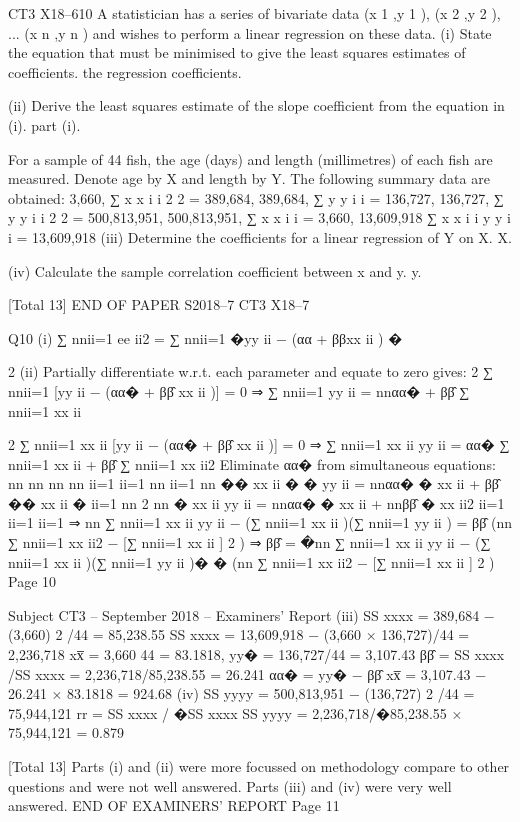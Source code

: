 CT3 X18–610
A statistician has a series of bivariate data {(x 1 ,y 1 ), (x 2 ,y 2 ), ... (x n ,y n )} and wishes to
perform a linear regression on these data.
(i) State the equation that must be minimised to give the least squares estimates of
coefficients.
the regression coefficients.

(ii) Derive the least squares estimate of the slope coefficient from the equation in
(i).
part (i).

For a sample of 44 fish, the age (days) and length (millimetres) of each fish are
measured. Denote age by X and length by Y. The following summary data are
obtained:
3,660, ∑ x x i i 2 2 = 389,684,
389,684, ∑ y y i i = 136,727,
136,727, ∑ y y i i 2 2 = 500,813,951,
500,813,951,
∑ x x i i = 3,660,
13,609,918
∑ x x i i y y i i = 13,609,918
(iii) Determine the coefficients for a linear regression of Y on X.
X.

(iv)
 Calculate the sample correlation coefficient between x and y.
y.

[Total 13]
END OF PAPER
S2018–7 
CT3 X18–7

Q10
(i) ∑ nnii=1 ee ii2 = ∑ nnii=1 �yy ii − (αα + ββxx ii ) �

2
(ii) Partially differentiate w.r.t. each parameter and equate to zero gives:
2 ∑ nnii=1 [yy ii − (αα� + ββ̂ xx ii )] = 0 ⇒ ∑ nnii=1 yy ii = nnαα� + ββ̂ ∑ nnii=1 xx ii

2 ∑ nnii=1 xx ii [yy ii − (αα� + ββ̂ xx ii )] = 0 ⇒ ∑ nnii=1 xx ii yy ii = αα� ∑ nnii=1 xx ii + ββ̂ ∑ nnii=1 xx ii2
Eliminate αα� from simultaneous equations:
nn
nn nn nn
ii=1 ii=1
nn ii=1
nn
�� xx ii � � yy ii = nnαα� � xx ii + ββ̂ �� xx ii �
ii=1
nn
2
nn � xx ii yy ii = nnαα� � xx ii + nnββ̂ � xx ii2
ii=1
ii=1
ii=1
⇒ nn ∑ nnii=1 xx ii yy ii − (∑ nnii=1 xx ii )(∑ nnii=1 yy ii ) = ββ̂ (nn ∑ nnii=1 xx ii2 − [∑ nnii=1 xx ii ] 2 )
⇒ ββ̂ = �nn ∑ nnii=1 xx ii yy ii − (∑ nnii=1 xx ii )(∑ nnii=1 yy ii )� � (nn ∑ nnii=1 xx ii2 − [∑ nnii=1 xx ii ] 2 )
Page 10



Subject CT3  – September 2018 – Examiners’ Report
(iii) SS xxxx = 389,684 − (3,660) 2 /44 = 85,238.55
SS xxxx = 13,609,918 − (3,660 × 136,727)/44 = 2,236,718
xx̅ =
3,660
44
= 83.1818, yy� = 136,727/44 = 3,107.43
ββ̂ = SS xxxx /SS xxxx = 2,236,718/85,238.55 = 26.241
αα� = yy� − ββ̂ xx̅ = 3,107.43 − 26.241 × 83.1818 = 924.68
(iv) SS yyyy = 500,813,951 − (136,727) 2 /44 = 75,944,121
rr = SS xxxx / �SS xxxx SS yyyy = 2,236,718/�85,238.55 × 75,944,121 = 0.879







[Total 13]
Parts (i) and (ii) were more focussed on methodology compare to other
questions and were not well answered. Parts (iii) and (iv) were very
well answered.
END OF EXAMINERS’ REPORT
Page 11
